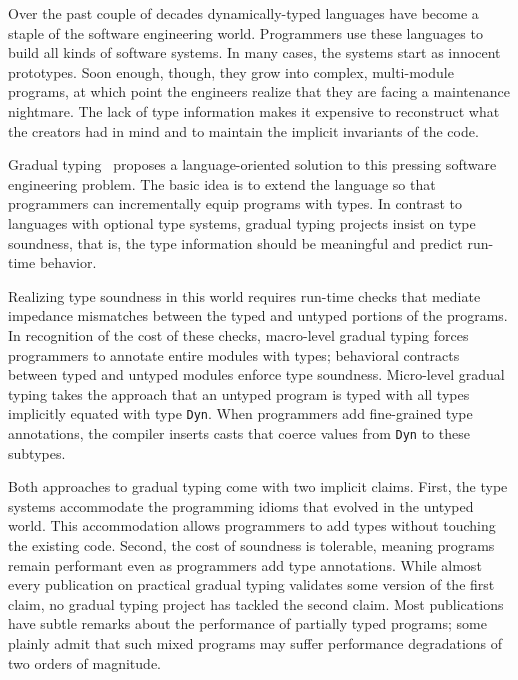 
Over the past couple of decades dynamically-typed languages have become a
 staple of the software engineering world. Programmers use these languages
 to build all kinds of software systems. In many cases, the systems start
 as innocent prototypes. Soon enough, though, they grow into complex,
 multi-module programs, at which point the engineers realize that they are
 facing a maintenance nightmare. The lack of type information makes it
 expensive to reconstruct what the creators had in mind and to maintain the
 implicit invariants of the code. 

Gradual typing~\cite{st:gradual06,thf:dls06} proposes a language-oriented
 solution to this pressing software engineering problem. The basic idea is
 to extend the language so that programmers can incrementally equip
 programs with types. In contrast to languages with optional type systems,
 gradual typing projects insist on type soundness, that is, the type
 information should be meaningful and predict run-time behavior. 

Realizing type soundness in this world requires run-time checks that
 mediate impedance mismatches between the typed and untyped portions of the
 programs. In recognition of the cost of these checks, macro-level gradual
 typing forces programmers to annotate entire modules with types;
 behavioral contracts~\cite{ff:ho-contracts} between typed and untyped
 modules enforce type soundness. Micro-level gradual typing takes the
 approach that an untyped program is typed with all types implicitly
 equated with type {\tt Dyn}. When programmers add fine-grained type
 annotations, the compiler inserts casts that coerce values from {\tt Dyn}
 to these subtypes.

Both approaches to gradual typing come with two implicit claims. First, the
 type systems accommodate the programming idioms that evolved in the
 untyped world. This accommodation allows programmers to add types without
 touching the existing code. Second, the cost of soundness is tolerable,
 meaning programs remain performant even as programmers add type
 annotations. While almost every publication on practical gradual typing
 validates some version of the first claim, no gradual typing project has
 tackled the second claim. Most publications have subtle remarks about the
 performance of partially typed programs; some plainly admit that such
 mixed programs may suffer performance degradations of two orders of
 magnitude. 

